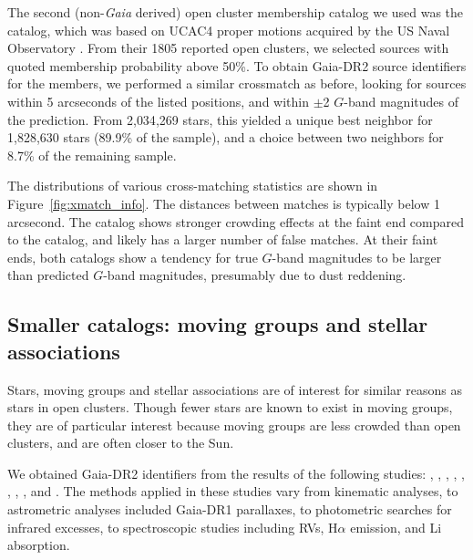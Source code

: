 \documentclass[12pt,twocolumn,tighten]{aastex62}
\begin{document}
The second (non-{\it Gaia} derived) open cluster membership catalog we
used was the \citet{dias_proper_2014} catalog, which was based on
UCAC4 proper motions acquired by the US Naval Observatory
\citep{zacharias_fourth_2013}.  From their 1805 reported open
clusters, we selected sources with quoted membership probability above
50\%.  To obtain Gaia-DR2 source identifiers for the members, we
performed a similar crossmatch as before, looking for sources within 5
arcseconds of the listed positions, and within $\pm$2 $G$-band
magnitudes of the prediction.  From 2{,}034{,}269 stars, this yielded
a unique best neighbor for 1{,}828{,}630 stars (89.9\% of the sample),
and a choice between two neighbors for 8.7\% of the remaining sample. 

The distributions of various cross-matching statistics are shown in
Figure~\ref{fig:xmatch_info}.  The distances between matches is
typically below 1 arcsecond.  The \citeauthor{dias_proper_2014}
catalog shows stronger crowding effects at the faint end compared to
the \citeauthor{Kharchenko_et_al_2013} catalog, and likely has a
larger number of false matches.  At their faint ends, both catalogs
show a tendency for true $G$-band magnitudes to be larger than
predicted $G$-band magnitudes, presumably due to dust reddening.


\subsection{Smaller catalogs: moving groups and stellar associations}
\label{subsec:mg}

Stars, moving groups and stellar associations are of interest for
similar reasons as stars in open clusters.  Though fewer stars
are known to exist in moving groups, they are of particular interest
because moving groups are less crowded than open clusters, and are
often closer to the Sun.

We obtained Gaia-DR2 identifiers from the results of the following
studies:
\citet{gagne_banyan_XI_2018},
\citet{gagne_banyan_XII_2018},
\citet{gagne_banyan_XIII_2018},
\citet{kraus_tucanahor_2014},
\citet{roser_deep_2011}, %
\citet{bell_32ori_2017},
\citet{rizzuto_multidimensional_2011},
\citet{oh_comoving_2017}, and
\citet{zari_3d_2018}. The methods applied in these studies
vary from kinematic analyses, to astrometric analyses included
Gaia-DR1 parallaxes, to photometric searches for infrared excesses, to
spectroscopic studies including RVs, H$\alpha$
emission, and Li absorption.
\end{document}
